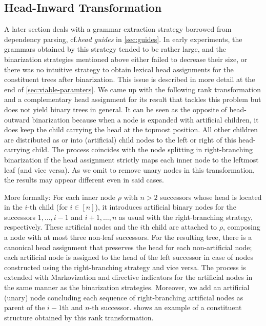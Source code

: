 \documentclass[../../document.tex]{subfiles}
\begin{document}
    \subsection{Head-Inward Transformation} \label{sec:extraction:bin:hi}
    A later section deals with a grammar extraction strategy borrowed from dependency parsing, cf.\@ \emph{head guides} in \cref{sec:guides}.
    In early experiments, the grammars obtained by this strategy tended to be rather large, and the binarization strategies mentioned above either failed to decrease their size, or there was no intuitive strategy to obtain lexical head assignments for the constituent trees after binarization.
    This issue is described in more detail at the end of \cref{sec:viable-paramters}.
    We came up with the following rank transformation and a complementary head assignment for its result that tackles this problem but does not yield binary trees in general.
    It can be seen as the opposite of head-outward binarization because when a node is expanded with artificial children, it does keep the child carrying the head at the topmost position.
    All other children are distributed as or into (artificial) child nodes to the left or right of this head-carrying child.
    The process coincides with the node splitting in right-branching binarization if the head assignment strictly maps each inner node to the leftmost leaf (and vice versa).
    As we omit to remove unary nodes in this transformation, the results may appear different even in said cases.

    More formally: For each inner node \(\rho\) with \(n > 2\) successors whose head is located in the \(i\)-th child (for \(i \in [n]\)), it introduces artificial binary nodes for the successors \(1, \ldots, i-1\) and \(i+1, \ldots, n\) as usual with the right-branching strategy, respectively.
    These artificial nodes and the \(i\)th child are attached to \(\rho\), composing a node with at most three non-leaf successors.
    For the resulting tree, there is a canonical head assignment that preserves the head for each non-artificial node; each artificial node is assigned to the head of the left successor in case of nodes constructed using the right-branching strategy and vice versa.
    The process is extended with Markovization and directive indicators for the artificial nodes in the same manner as the binarization strategies.
    Moreover, we add an artificial (unary) node concluding each sequence of right-branching artificial nodes as parent of the \(i-1\)th and \(n\)-th successor.
     shows an example of a constituent structure obtained by this rank transformation.
\end{document}
